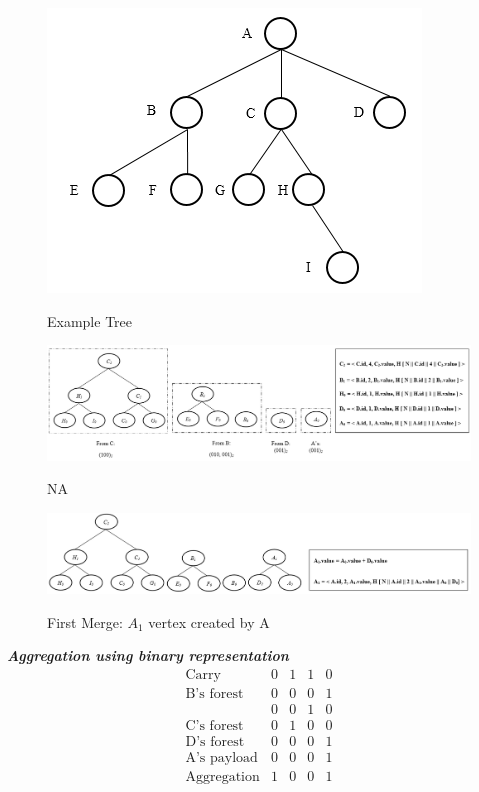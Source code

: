 	\begin{figure}[hp]
		\centering
		\includegraphics[scale = 0.5]{images/example-tree.png}\\
		\caption{Example Tree}
	\end{figure}

	\begin{figure}[hp]
		\centering
		\includegraphics[scale = 0.5]{images/commitment-tree-example-1.png}\\
		\caption{NA}
	\end{figure}

	\begin{figure}[hp]
		\centering
		\includegraphics[scale = 0.5]{images/commitment-tree-example-2.png}\\
		\caption{First Merge: $A_{1}$ vertex created by A}
	\end{figure}

	\textit{\textbf{ Aggregation using binary representation}}
	\[ 
		\begin{array}{lcccc}
			\mbox{Carry} & 0 & 1 & 1 & 0\\
			\hline
			\mbox{B's forest} & 0 & 0 & 0 & 1 \\
			\mbox{ } & 0 & 0 & 1 & 0 \\
			\hline
			\mbox{C's forest} & 0 & 1 & 0 & 0 \\
			\hline
			\mbox{D's forest} & 0 & 0 & 0 & 1 \\
			\hline
			\mbox{A's payload} & 0 & 0 & 0 & 1 \\
			\hline
			\mbox{Aggregation} & 1 & 0 & 0 & 1 
		\end{array}
	\] 

